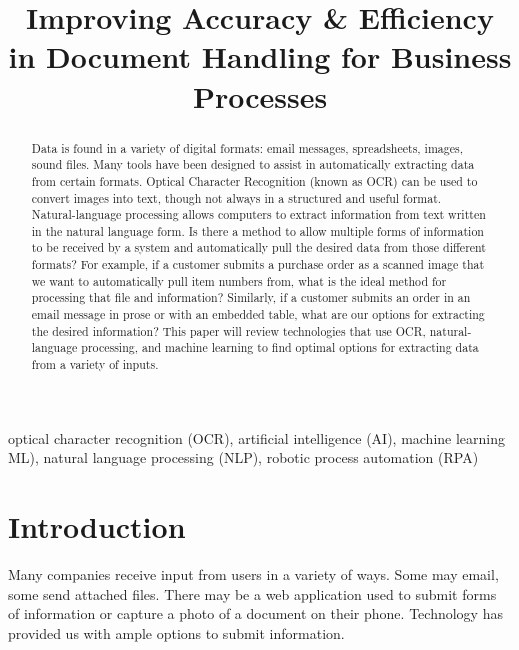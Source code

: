 \documentclass[conference]{IEEEtran}
\begin{document}
\title{Improving Accuracy \& Efficiency in Document Handling for Business Processes}

\author{
}

\maketitle

\begin{abstract}
Data is found in a variety of digital formats: email messages, spreadsheets, images, sound files. Many tools have been designed to assist in automatically extracting data from certain formats. Optical Character Recognition (known as OCR) can be used to convert images into text, though not always in a structured and useful format. Natural-language processing allows computers to extract information from text written in the natural language form. Is there a method to allow multiple forms of information to be received by a system and automatically pull the desired data from those different formats? For example, if a customer submits a purchase order as a scanned image that we want to automatically pull item numbers from, what is the ideal method for processing that file and information? Similarly, if a customer submits an order in an email message in prose or with an embedded table, what are our options for extracting the desired information? This paper will review technologies that use OCR, natural-language processing, and machine learning to find optimal options for extracting data from a variety of inputs.
\end{abstract}

\begin{IEEEkeywords}
optical character recognition (OCR), artificial intelligence (AI), machine learning ML), natural language processing (NLP), robotic process automation (RPA)
\end{IEEEkeywords}

\section{Introduction}
Many companies receive input from users in a variety of ways. Some may email, some send attached files. There may be a web application used to submit forms of information or capture a photo of a document on their phone. Technology has provided us with ample options to submit information.
\end{document}
